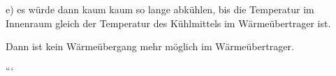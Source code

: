e) es würde dann kaum kaum so lange abkühlen, bis die Temperatur im Innenraum gleich der Temperatur des Kühlmittels im Wärmeübertrager ist.

Dann ist kein Wärmeübergang mehr möglich im Wärmeübertrager.

```